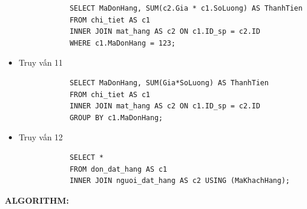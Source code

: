 \documentclass[12pt,a4paper]{report}
\begin{document}
\begin{itemize}
\begin{lstlisting}
			SELECT MaDonHang, SUM(c2.Gia * c1.SoLuong) AS ThanhTien
			FROM chi_tiet AS c1
			INNER JOIN mat_hang AS c2 ON c1.ID_sp = c2.ID
			WHERE c1.MaDonHang = 123;
		\end{lstlisting}
		\item Truy vấn 11
		\begin{lstlisting}
			SELECT MaDonHang, SUM(Gia*SoLuong) AS ThanhTien
			FROM chi_tiet AS c1
			INNER JOIN mat_hang AS c2 ON c1.ID_sp = c2.ID
			GROUP BY c1.MaDonHang;
		\end{lstlisting}
		\item Truy vấn 12
		\begin{lstlisting}
			SELECT *
			FROM don_dat_hang AS c1
			INNER JOIN nguoi_dat_hang AS c2 USING (MaKhachHang);
		\end{lstlisting}
	\end{itemize}
	
	{\bf ALGORITHM:}
	
\end{document}
